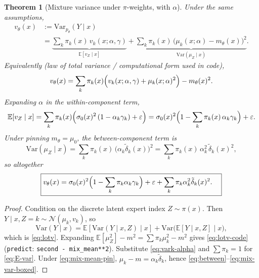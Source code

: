 \documentclass[11pt,a4paper]{article}
\theoremstyle{plain}
\newtheorem{theorem}{Theorem}[section]
\theoremstyle{definition}
\theoremstyle{remark}
\newcommand{\E}{\mathbb{E}}
\newcommand{\Var}{\mathrm{Var}}
\newcommand{\Ncal}{\mathcal{N}}
\newcommand{\tht}{\theta}
\begin{document}
\begin{theorem}[Mixture variance under \(\pi\)-weights, with \(\alpha\)]
\label{thm:mix-var}
Under the same assumptions,
\begin{equation}
  \begin{aligned}
  v_\tht(x)
  &:=
  \Var_{p_\tht}(Y\mid x)
  \\
  &=
  \underbrace{
    \sum_k\pi_k(x)\,v_k(x;\alpha,\gamma)
  }_{\E[v_Z\mid x]}
  +
  \underbrace{
    \sum_k\pi_k(x)\,
    \bigl(\mu_k(x;\alpha)-m_\tht(x)\bigr)^2
  }_{\Var(\mu_Z\mid x)}.
  \end{aligned}
  \label{eq:lotv}
\end{equation}
Equivalently (law of total variance / computational form used in code),
\begin{equation}
  v_\tht(x)
  =
  \sum_k\pi_k(x)
  \Bigl(
    v_k(x;\alpha,\gamma)
    +
    \mu_k(x;\alpha)^2
  \Bigr)
  -
  m_\tht(x)^2.
  \label{eq:lotv-code}
\end{equation}
Expanding \(\alpha\) in the within-component term,
\begin{equation}
  \E[v_Z\mid x]
  =
  \sum_k\pi_k(x)
  \Bigl(
    \sigma_0(x)^2\,(1-\alpha_k\gamma_k)+\varepsilon
  \Bigr)
  =
  \sigma_0(x)^2
  \Bigl(
    1
    -
    \sum_k\pi_k(x)\,\alpha_k\gamma_k
  \Bigr)
  +
  \varepsilon.
  \label{eq:E-var}
\end{equation}
Under pinning \(m_\tht=\mu_0\), the between-component term is
\begin{equation}
  \Var(\mu_Z\mid x)
  =
  \sum_k\pi_k(x)\,
  \bigl(\alpha_k\tilde\delta_k(x)\bigr)^2
  =
  \sum_k\pi_k(x)\,\alpha_k^2\,\tilde\delta_k(x)^2,
  \label{eq:between}
\end{equation}
so altogether
\begin{equation}
  \boxed{
  \begin{aligned}
  v_\tht(x)
  &=
  \sigma_0(x)^2
  \Bigl(
    1-\sum_k\pi_k\alpha_k\gamma_k
  \Bigr)
  +
  \varepsilon
  +
  \sum_k\pi_k\alpha_k^2\tilde\delta_k(x)^2.
  \end{aligned}
  }
  \label{eq:mix-var-boxed}
\end{equation}
\end{theorem}

\begin{proof}
Condition on the discrete latent expert index \(Z\sim\pi(x)\). Then
\(Y\mid x,Z=k\sim\Ncal(\mu_k,v_k)\), so
\[
  \Var(Y\mid x)
  =
  \E[\Var(Y\mid x,Z)\mid x]
  +
  \Var\bigl(\E[Y\mid x,Z]\mid x\bigr),
\]
which is \eqref{eq:lotv}. Expanding
\(\E[\mu_Z^2]-m^2=\sum\pi_k\mu_k^2-m^2\) gives \eqref{eq:lotv-code}
(\texttt{predict}: \texttt{second - mix\_mean**2}).
Substitute \eqref{eq:vark-alpha} and \(\sum\pi_k=1\) for \eqref{eq:E-var}.
Under \eqref{eq:mix-mean-pin}, \(\mu_k-m=\alpha_k\tilde\delta_k\), hence
\eqref{eq:between}--\eqref{eq:mix-var-boxed}.
\end{proof}
\end{document}
